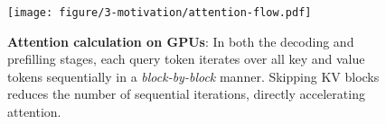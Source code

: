 
\begin{figure}
    \centering
    \texttt{[image: figure/3-motivation/attention-flow.pdf]}
    \caption{\textbf{Attention calculation on GPUs}: In both the decoding and prefilling stages, each query token iterates over all key and value tokens sequentially in a \textit{block-by-block} manner. Skipping KV blocks reduces the number of sequential iterations, directly accelerating attention.} %
    \label{fig:motivation:attention_flow}
    \vspace{-7pt}
\end{figure}
